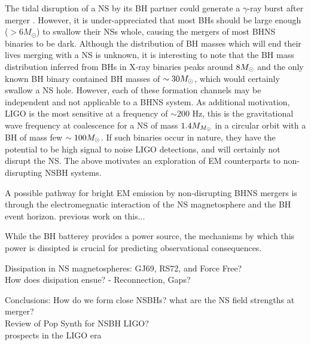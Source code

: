 The tidal disruption of a NS by its BH partner could generate a $\gamma$-ray
burst after merger \citep{NPP:NSBH_GRB:1992}. However, it is under-appreciated
that most BHs should be large enough ($> 6M_\odot $) to swallow their NSs
whole, causing the mergers of most BHNS binaries to be dark. 
Although the distribution of BH masses
which will end their lives merging with a NS is unknown, it is interesting to
note that the BH mass distribution inferred from BHs in X-ray binaries peaks
around $8 {M_{\odot}}$ \citep{Orzel:2008} and the only known BH binary contained BH
masses of $\sim 30 {M_{\odot}}$, which would certainly swallow a NS hole. However,
each of these formation channels may be independent and not applicable to a
BHNS system. As additional motivation, LIGO is the most sensitive at a
frequency of $\sim 200$ Hz, this is the gravitational wave frequency at
coalescence for a NS of mass $1.4 M_{{M_{\odot}}}$ in a circular orbit with a BH of
mass few $\sim100 {M_{\odot}}$. If such binaries occur in nature, they have the
potential to be high signal to noise LIGO detections, and will certainly not
disrupt the NS. The above motivates an exploration of EM counterparts to non-
disrupting NSBH systems.


A possible pathway for bright EM emission by non-disrupting BHNS mergers is through the electromegnatic interaction of the NS magnetosphere and the BH event horizon. 
previous work on this...


While the BH batterey provides a power source, the mechanisms by which this power is dissipted is crucial for predicting observational consequences. 

Dissipation in NS magnetospheres:
GJ69, RS72, and Force Free?\\
How does disipation ensue? - Reconnection, Gaps?

Conclusions:
How do we form close NSBHs?
what are the NS field strengths at merger?\\

Review of Pop Synth for NSBH LIGO?\\
prospects in the LIGO era









